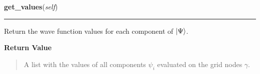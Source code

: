     \vspace{0.5ex}

\hspace{.8\funcindent}\begin{boxedminipage}{\funcwidth}

    \raggedright \textbf{get\_values}(\textit{self})

    \vspace{-1.5ex}

    \rule{\textwidth}{0.5\fboxrule}
\setlength{\parskip}{2ex}
    Return the wave function values for each component of
    $\Ket{\Psi}$.

\setlength{\parskip}{1ex}
      \textbf{Return Value}
    \vspace{-1ex}

      \begin{quote}
      A list with the values of all components $\psi_i$
      evaluated on the grid nodes $\gamma$.

      \end{quote}

    \end{boxedminipage}

    \label{WaveFunction:WaveFunction:set_values}

    \vspace{0.5ex}

